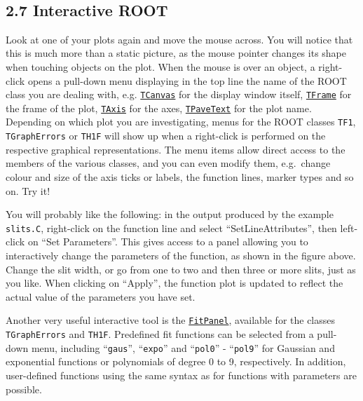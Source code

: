 \documentclass{article}
\begin{document}
    \begin{center}
    \end{center}
    { \hspace*{\fill} \\}
    
    \subsection{2.7 Interactive ROOT}\label{interactive-root}

Look at one of your plots again and move the mouse across. You will
notice that this is much more than a static picture, as the mouse
pointer changes its shape when touching objects on the plot. When the
mouse is over an object, a right-click opens a pull-down menu displaying
in the top line the name of the ROOT class you are dealing with, e.g.
\href{https://root.cern.ch/doc/master/classTCanvas.html}{\texttt{TCanvas}}
for the display window itself,
\href{https://root.cern.ch/doc/v606/classTFrame.html}{\texttt{TFrame}}
for the frame of the plot,
\href{https://root.cern.ch/doc/master/classTAxis.html}{\texttt{TAxis}}
for the axes,
\href{https://root.cern.ch/doc/v606/classTPaveText.html}{\texttt{TPaveText}}
for the plot name. Depending on which plot you are investigating, menus
for the ROOT classes \texttt{TF1}, \texttt{TGraphErrors} or
\texttt{TH1F} will show up when a right-click is performed on the
respective graphical representations. The menu items allow direct access
to the members of the various classes, and you can even modify them,
e.g.~change colour and size of the axis ticks or labels, the function
lines, marker types and so on. Try it!

You will probably like the following: in the output produced by the
example \texttt{slits.C}, right-click on the function line and select
``SetLineAttributes'', then left-click on ``Set Parameters''. This gives
access to a panel allowing you to interactively change the parameters of
the function, as shown in the figure above. Change the slit width, or go
from one to two and then three or more slits, just as you like. When
clicking on ``Apply'', the function plot is updated to reflect the
actual value of the parameters you have set.

Another very useful interactive tool is the
\href{https://root.cern.ch/fit-panel}{\texttt{FitPanel}}, available for
the classes \texttt{TGraphErrors} and \texttt{TH1F}. Predefined fit
functions can be selected from a pull-down menu, including
``\texttt{gaus}'', ``\texttt{expo}'' and ``\texttt{pol0}'' -
``\texttt{pol9}'' for Gaussian and exponential functions or polynomials
of degree 0 to 9, respectively. In addition, user-defined functions
using the same syntax as for functions with parameters are possible.
\end{document}
